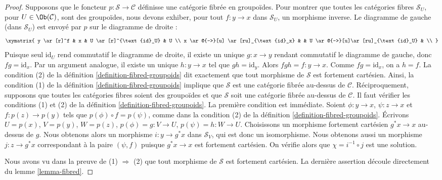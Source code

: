 \begin{proof}
Supposons que le foncteur $p : \mathcal{S} \to \mathcal{C}$ définisse une catégorie fibrée en groupoïdes.
Pour montrer que toutes les catégories fibres $\mathcal{S}_U$, pour
$U \in \Ob(\mathcal{C})$,
sont des groupoïdes, nous devons exhiber, pour tout $f : y \to x$ dans $\mathcal{S}_U$, un
morphisme inverse. Le diagramme de gauche (dans $\mathcal{S}_U$) est envoyé par
$p$ sur le diagramme de droite :
$$
\xymatrix{
y \ar[r]^f & x & U \ar[r]^{\text{id}_U} & U \\
x \ar@{-->}[u] \ar[ru]_{\text{id}_x} & &
U \ar@{-->}[u]\ar[ru]_{\text{id}_U} & \\
}
$$
Puisque seul $\text{id}_U$ rend commutatif le diagramme de droite, il existe un
unique $g : x \to y$ rendant commutatif le diagramme de gauche, donc
$fg = \text{id}_x$. Par un argument analogue, il existe un unique $h : y \to x$ tel
que $gh = \text{id}_y$. Alors $fgh = f : y \to x$. Comme $fg = \text{id}_x$,
on a $h = f$. La condition (2) de la définition \ref{definition-fibred-groupoids} dit
exactement que tout morphisme de $\mathcal{S}$ est fortement cartésien. Ainsi,
la condition (1) de la définition \ref{definition-fibred-groupoids} implique que
$\mathcal{S}$ est une catégorie fibrée au-dessus de $\mathcal{C}$.
\medskip\noindent
Réciproquement, supposons que toutes les catégories fibres soient des groupoïdes et que
$\mathcal{S}$ soit une catégorie fibrée au-dessus de $\mathcal{C}$.
Il faut vérifier les conditions (1) et (2) de la
définition \ref{definition-fibred-groupoids}.
La première condition est immédiate. Soient $\phi : y \to x$,
$\psi : z \to x$ et $f : p(z) \to p(y)$ tels que
$p(\phi) \circ f = p(\psi)$, comme dans la condition (2) de la
définition \ref{definition-fibred-groupoids}.
Écrivons $U = p(x)$, $V = p(y)$, $W = p(z)$, $p(\phi) = g : V \to U$,
$p(\psi) = h : W \to U$. Choisissons un morphisme fortement cartésien $g^*x \to x$
au-dessus de $g$. Nous obtenons alors un morphisme $i : y \to g^*x$ dans
$\mathcal{S}_V$, qui est donc un isomorphisme. Nous
obtenons aussi un morphisme $j : z \to g^*x$ correspondant à
la paire $(\psi, f)$ puisque $g^*x \to x$ est fortement cartésien.
On vérifie alors que $\chi = i^{-1} \circ j$ est une solution.

\medskip\noindent
Nous avons vu dans la preuve de (1) $\Rightarrow$ (2) que
tout morphisme de $\mathcal{S}$ est fortement cartésien.
La dernière assertion découle directement du lemme \ref{lemma-fibred}.
\end{proof}

